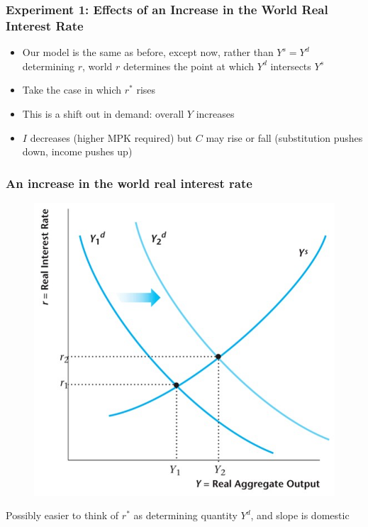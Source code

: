 \documentclass{beamer}
\begin{document}
\begin{frame}
\frametitle[alignment=center]{Experiment 1: Effects of an Increase in the World Real Interest Rate}
\begin{itemize}
\item Our model is the same as before, except now, rather than $Y^s=Y^d$ determining $r$, world $r$ determines the point at which $Y^d$ intersects $Y^s$ 
\bigskip
\item Take the case in which $r^*$ rises
\bigskip
\item This is a shift out in demand: overall $Y$ increases
\bigskip
\item $I$ decreases (higher MPK required) but $C$ may rise or fall (substitution pushes down, income pushes up)
\end{itemize}
\end{frame}

\begin{frame}
\frametitle[alignment=center]{An increase in the world real interest rate}
\begin{figure}
\centering
\includegraphics[scale=0.55]{Figures/W_Fig_16pt8.png}
\end{figure}
Possibly easier to think of $r^*$ as determining quantity $Y^d$, and slope is domestic
\end{frame}
\end{document}
